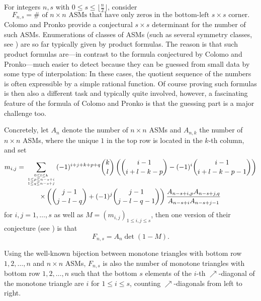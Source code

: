\documentclass[12pt,dvipsnames]{amsart}
\theoremstyle{definition}
\begin{document}
For integers $n,s$ with $0 \le s \le \lfloor \frac{n}{2} \rfloor$, consider 
$$F_{n,s}= \# \text{ of $n \times n$ ASMs that have only zeros in the bottom-left $s \times s$ corner}. 
$$
Colomo and Pronko provide a conjectural 
$s \times s$ determinant for the number of such ASMs. Enumerations of classes of ASMs 
(such as several symmetry classes, see \cite{Kup00}) are so far typically given by product formulas. The reason is 
that such product formulas are---in contrast to the formula conjectured by Colomo and Pronko---much easier 
to detect because they can be guessed from small data by some type of interpolation: In these cases, the quotient sequence of the numbers is often expressible by a simple rational function. Of course proving such formulas is then also a different task and typically quite involved, however, a fascinating feature of the formula of Colomo and Pronko is that the guessing part is a major challenge too. 

Concretely, 
let $A_n$ denote the number of $n \times n$ ASMs and $A_{n,k}$ the number of $n \times n$ ASMs, where the unique $1$ in the top 
row is located in the $k$-th column, and set 
\begin{multline*} 
m_{i,j} =  \sum_{0 \le l \le k \atop {1 \le p \le n-s+i \atop 1 \le q \le n-s+j}} 
(-1)^{i+j+k+p+q} \binom{k}{l} \left( \binom{i-1}{i+l-k-p} - (-1)^i \binom{i-1}{i+l-k-p-1} \right) \\
\times 
\left( \binom{j-1}{j-l-q} + (-1)^j \binom{j-1}{j-l-q-1} \right) \frac{A_{n-s+i,p} A_{n-s+j,q}}{A_{n-s+i} A_{n-s+j-1}}  
\end{multline*}
for $i,j=1,\ldots,s$ as well as $M=(m_{i,j})_{1 \le i,j \le s}$, then one version of their conjecture (see \cite[Conjecture~1]{CP25}) is that 
$$
F_{n,s} = A_n \det (1-M).
$$

\bigskip

Using the well-known bijection between monotone triangles with bottom row $1,2,\ldots,n$ and 
$n \times n$ ASMs, $F_{n,s}$ is also the number of monotone triangles with bottom row $1,2,\ldots,n$ such that 
the bottom $s$ elements of the $i$-th $\nearrow$-diagonal of the monotone triangle are $i$ for $1 \le i \le s$, 
counting $\nearrow$-diagonals from left to right. 
\end{document}
